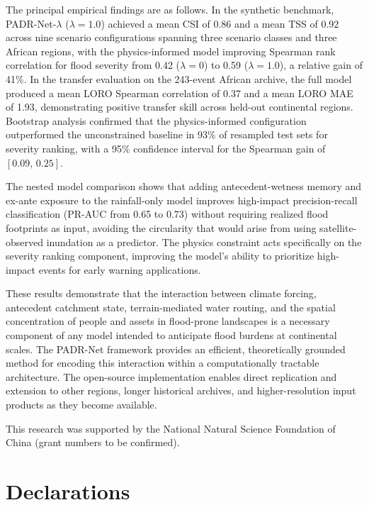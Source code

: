 \documentclass[pdflatex,sn-mathphys-ay]{sn-jnl}
\theoremstyle{thmstyleone}
\theoremstyle{thmstylethree}
\theoremstyle{thmstyletwo}
\begin{document}
The principal empirical findings are as follows.  In the synthetic
benchmark, PADR-Net-$\lambda$ ($\lambda=1.0$) achieved a mean CSI of
0.86 and a mean TSS of 0.92 across nine scenario configurations
spanning three scenario classes and three African regions, with the
physics-informed model improving Spearman rank correlation for flood
severity from 0.42 ($\lambda=0$) to 0.59 ($\lambda=1.0$), a relative
gain of 41\%.  In the transfer evaluation on the 243-event
African archive, the full model produced a mean LORO Spearman
correlation of 0.37 and a mean LORO MAE of 1.93, demonstrating
positive transfer skill across held-out continental regions.
Bootstrap analysis confirmed that the physics-informed configuration
outperformed the unconstrained baseline in 93\% of resampled test
sets for severity ranking, with a 95\% confidence interval for the
Spearman gain of $[0.09,\, 0.25]$.

The nested model comparison shows that adding antecedent-wetness
memory and ex-ante exposure to the rainfall-only model improves
high-impact precision-recall classification (PR-AUC from 0.65 to
0.73) without requiring realized flood footprints as input, avoiding
the circularity that would arise from using satellite-observed
inundation as a predictor.  The physics constraint acts specifically
on the severity ranking component, improving the model's ability to
prioritize high-impact events for early warning applications.

These results demonstrate that the interaction between climate
forcing, antecedent catchment state, terrain-mediated water routing,
and the spatial concentration of people and assets in flood-prone
landscapes is a necessary component of any model intended to
anticipate flood burdens at continental scales.  The PADR-Net
framework provides an efficient, theoretically grounded method for
encoding this interaction within a computationally tractable
architecture.  The open-source implementation enables direct
replication and extension to other regions, longer historical
archives, and higher-resolution input products as they become
available.

\backmatter

This research was supported by the National Natural Science Foundation
of China (grant numbers to be confirmed).

\section*{Declarations}
\end{document}
